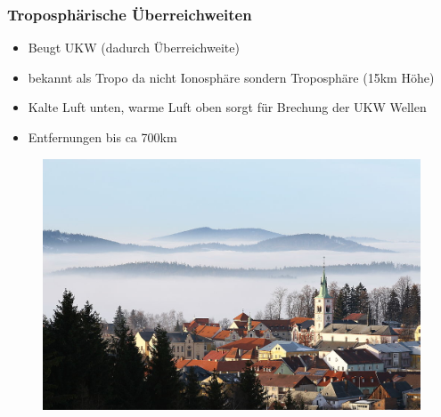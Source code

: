 \begin{frame}
  \frametitle{Troposphärische Überreichweiten}
  \begin{itemize}
    \item Beugt UKW (dadurch Überreichweite)
    \item bekannt als Tropo da nicht Ionosphäre sondern Troposphäre (15km Höhe)
    \item Kalte Luft unten, warme Luft oben sorgt für Brechung der UKW Wellen
    \item Entfernungen bis ca 700km
  \end{itemize}
  \begin{center}
    \begin{figure}
      \includegraphics[width=.65\textwidth,height=.5\textheight,keepaspectratio]{e09/tropo.jpg}
    \end{figure}
  \end{center}
\end{frame}


%

